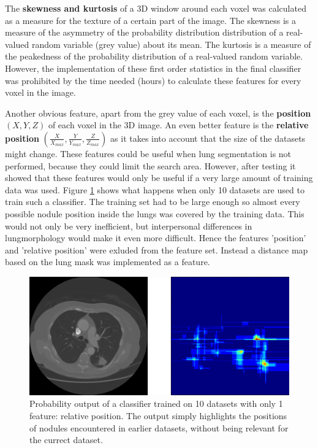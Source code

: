 The \textbf{skewness and kurtosis} of a 3D window around each
voxel was calculated as a measure for the texture of a certain part of the image. The
skewness is a measure of the asymmetry of the probability distribution
distribution of a real-valued random variable (grey value) about its mean. The
kurtosis is a measure of the peakedness of the probability distribution of a
real-valued random variable. However, the implementation of these first order
statistics in the final classifier was prohibited by the time needed (hours) to
calculate these features for every voxel in the image.

Another obvious feature, apart from the grey value of each voxel, is the
\textbf{position} $(X, Y, Z)$ of each voxel in the 3D image. An even better
feature is the \textbf{relative position} $(\tfrac{X}{X_{max}},
\tfrac{Y}{Y_{max}}, \tfrac{Z}{Z_{max}})$ as it takes into account that the size
of the datasets might change. These features could be useful when lung
segmentation is not performed, because they could limit the search area.
However, after testing it showed that these features would only be useful if a
very large amount of training data was used. Figure \ref{fig:posFeature} shows
what happens when only 10 datasets are used to train such a classifier. The
training set had to be large enough so almost every possible nodule position
inside the lungs was covered by the training data. This would not only be very
inefficient, but interpersonal differences in lungmorphology would make it even
more difficult. Hence the features 'position' and 'relative position' were
exluded from the feature set.
Instead a distance map based on the lung mask was implemented as a feature.

\begin{figure}[ht]
\begin{center}
  \includegraphics[width=\linewidth]{img/RelPositionFeature.png}
  \caption[]{Probability output of a classifier trained on 10 datasets with only
  1 feature: relative position. The output simply highlights the positions of
  nodules encountered in earlier datasets, without being relevant for the
  currect dataset.}
  \label{fig:posFeature}
\end{center}
\end{figure}

